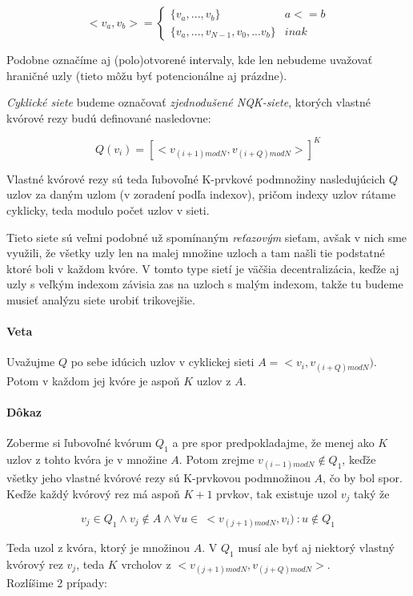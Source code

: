 $$<v_a, v_b> = \begin{cases}
                 \{v_a, ..., v_b\} & a<=b \\
                 \{v_a, ...,v_{N-1}, v_0,... v_b\} & inak
               \end{cases}
$$

Podobne označíme aj (polo)otvorené intervaly, kde len nebudeme uvažovať
hraničné uzly (tieto môžu byť potencionálne aj prázdne).

\textit{Cyklické siete} budeme označovať \textit{zjednodušené NQK-siete},
ktorých vlastné kvórové rezy budú definované nasledovne:

$$Q(v_i)= [<v_{(i+1) mod N}, v_{(i+Q) mod N}>]^K$$

Vlastné kvórové rezy sú teda ľubovoľné K-prvkové podmnožiny nasledujúcich $Q$ uzlov
za daným uzlom (v zoradení podľa indexov),
pričom indexy uzlov rátame cyklicky, teda modulo počet uzlov v sieti.

Tieto siete sú veľmi podobné už spomínaným \textit{reťazovým} sieťam, avšak
v nich sme využili, že všetky uzly  len na malej množine uzloch
a tam našli tie podstatné ktoré boli v každom kvóre.
V tomto type sietí je väčšia decentralizácia, keďže aj uzly s veľkým indexom
závisia zas na uzloch s malým indexom, takže tu budeme musieť analýzu siete
urobiť trikovejšie.

\paragraph{Veta}
Uvažujme $Q$ po sebe idúcich uzlov v cyklickej sieti $A=<v_i, v_{(i+Q) mod N})$.
Potom v každom jej kvóre je aspoň $K$ uzlov z $A$.

\paragraph{Dôkaz}
Zoberme si ľubovoľné kvórum $Q_1$ a pre spor predpokladajme, že menej ako
$K$ uzlov z tohto kvóra je v množine $A$.
Potom zrejme $v_{(i-1) mod N}\notin Q_1$, keďže všetky jeho vlastné kvórové rezy
sú K-prvkovou podmnožinou $A$, čo by bol spor.
Keďže každý kvórový rez má aspoň $K+1$ prvkov, tak existuje uzol $v_j$ taký že

$$v_j\in Q_1\land v_j\notin A\land \forall u\in\: <v_{(j+1) mod N}, v_i)\: :u\notin Q_1$$

Teda  uzol z kvóra, ktorý je  množinou $A$.
V $Q_1$ musí ale byť aj niektorý vlastný kvórový rez $v_j$, teda $K$ vrcholov
z $<v_{(j+1)mod N}, v_{(j+Q) mod N}>$.\\
Rozlíšime 2 prípady:

